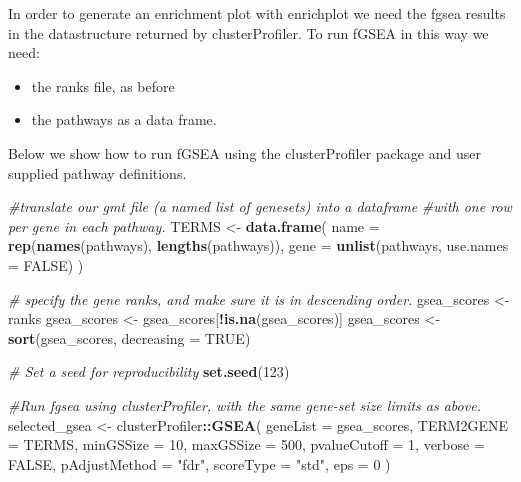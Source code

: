 \documentclass[
]{book}
\newenvironment{Shaded}{\begin{snugshade}}{\end{snugshade}}
\newcommand{\AttributeTok}[1]{\textcolor[rgb]{0.13,0.29,0.53}{#1}}
\newcommand{\CommentTok}[1]{\textcolor[rgb]{0.56,0.35,0.01}{\textit{#1}}}
\newcommand{\ConstantTok}[1]{\textcolor[rgb]{0.56,0.35,0.01}{#1}}
\newcommand{\DecValTok}[1]{\textcolor[rgb]{0.00,0.00,0.81}{#1}}
\newcommand{\FunctionTok}[1]{\textcolor[rgb]{0.13,0.29,0.53}{\textbf{#1}}}
\newcommand{\NormalTok}[1]{#1}
\newcommand{\OtherTok}[1]{\textcolor[rgb]{0.56,0.35,0.01}{#1}}
\newcommand{\SpecialCharTok}[1]{\textcolor[rgb]{0.81,0.36,0.00}{\textbf{#1}}}
\newcommand{\StringTok}[1]{\textcolor[rgb]{0.31,0.60,0.02}{#1}}
\providecommand{\tightlist}{%
  \setlength{\itemsep}{0pt}\setlength{\parskip}{0pt}}
\begin{document}
In order to generate an enrichment plot with enrichplot we need the fgsea results in the datastructure returned by clusterProfiler. To run fGSEA in this way we need:

\begin{itemize}
\tightlist
\item
  the ranks file, as before
\item
  the pathways as a data frame.
\end{itemize}

Below we show how to run fGSEA using the clusterProfiler package and user supplied pathway definitions.

\begin{Shaded}
\begin{Highlighting}[]
\CommentTok{\#translate our gmt file (a named list of genesets) into a dataframe}
\CommentTok{\#with one row per gene in each pathway.}
\NormalTok{TERMS }\OtherTok{\textless{}{-}} \FunctionTok{data.frame}\NormalTok{(}
    \AttributeTok{name =} \FunctionTok{rep}\NormalTok{(}\FunctionTok{names}\NormalTok{(pathways), }\FunctionTok{lengths}\NormalTok{(pathways)),}
    \AttributeTok{gene =} \FunctionTok{unlist}\NormalTok{(pathways, }\AttributeTok{use.names =} \ConstantTok{FALSE}\NormalTok{)}
\NormalTok{  )}

\CommentTok{\# specify the gene ranks, and make sure it is in descending order.}
\NormalTok{gsea\_scores }\OtherTok{\textless{}{-}}\NormalTok{ ranks}
\NormalTok{gsea\_scores }\OtherTok{\textless{}{-}}\NormalTok{ gsea\_scores[}\SpecialCharTok{!}\FunctionTok{is.na}\NormalTok{(gsea\_scores)]}
\NormalTok{gsea\_scores }\OtherTok{\textless{}{-}} \FunctionTok{sort}\NormalTok{(gsea\_scores, }\AttributeTok{decreasing =} \ConstantTok{TRUE}\NormalTok{)}

\CommentTok{\# Set a seed for reproducibility}
\FunctionTok{set.seed}\NormalTok{(}\DecValTok{123}\NormalTok{)}

\CommentTok{\#Run fgsea using clusterProfiler, with the same gene{-}set size limits as above.}
\NormalTok{selected\_gsea }\OtherTok{\textless{}{-}}\NormalTok{ clusterProfiler}\SpecialCharTok{::}\FunctionTok{GSEA}\NormalTok{(}
    \AttributeTok{geneList =}\NormalTok{ gsea\_scores,}
    \AttributeTok{TERM2GENE =}\NormalTok{ TERMS,}
    \AttributeTok{minGSSize =} \DecValTok{10}\NormalTok{,}
    \AttributeTok{maxGSSize =} \DecValTok{500}\NormalTok{,}
    \AttributeTok{pvalueCutoff =} \DecValTok{1}\NormalTok{,}
    \AttributeTok{verbose =} \ConstantTok{FALSE}\NormalTok{,}
    \AttributeTok{pAdjustMethod =} \StringTok{"fdr"}\NormalTok{,}
    \AttributeTok{scoreType =} \StringTok{"std"}\NormalTok{,}
    \AttributeTok{eps =} \DecValTok{0}
\NormalTok{  )}
\end{Highlighting}
\end{Shaded}
\end{document}
